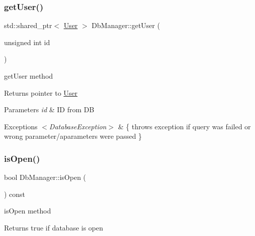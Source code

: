\subsubsection{\texorpdfstring{get\+User()}{getUser()}}
{\footnotesize\ttfamily std\+::shared\+\_\+ptr$<$ \hyperlink{class_user}{User} $>$ Db\+Manager\+::get\+User (\begin{DoxyParamCaption}\item[{unsigned int}]{id }\end{DoxyParamCaption})}



get\+User method 

\begin{DoxyReturn}{Returns}
pointer to \hyperlink{class_user}{User} 
\end{DoxyReturn}

\begin{DoxyParams}{Parameters}
{\em id} & ID from DB \\
\hline
\end{DoxyParams}

\begin{DoxyExceptions}{Exceptions}
{\em $<$\+Database\+Exception$>$} & \{ throws exception if query was failed or wrong parameter/aparameters were passed \} \\
\hline
\end{DoxyExceptions}
\mbox{\label{class_db_manager_ac04baba8f5d5197f8bcd9230393501de}} 
\subsubsection{\texorpdfstring{is\+Open()}{isOpen()}}
{\footnotesize\ttfamily bool Db\+Manager\+::is\+Open (\begin{DoxyParamCaption}{ }\end{DoxyParamCaption}) const}



is\+Open method 

\begin{DoxyReturn}{Returns}
true if database is open 
\end{DoxyReturn}
\mbox{\label{class_db_manager_aae0009d480007ab6bcd7cab246d1f6d8}} 
